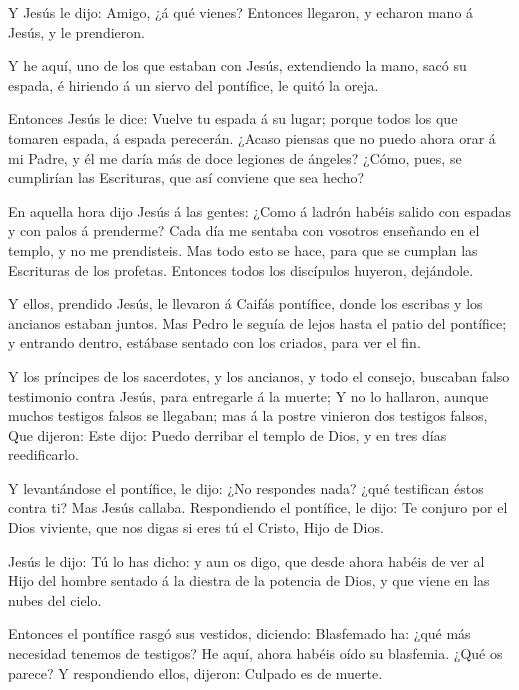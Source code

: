  Y Jesús le dijo: Amigo, ¿á qué vienes? Entonces llegaron,
y echaron mano á Jesús, y le prendieron.

 Y he aquí, uno de los que estaban con Jesús, extendiendo
la mano, sacó su espada, é hiriendo á un siervo del pontífice, le quitó
la oreja.

 Entonces Jesús le dice: Vuelve tu espada á su lugar;
porque todos los que tomaren espada, á espada perecerán. 
¿Acaso piensas que no puedo ahora orar á mi Padre, y él me daría más de
doce legiones de ángeles?  ¿Cómo, pues, se cumplirían las
Escrituras, que así conviene que sea hecho?

 En aquella hora dijo Jesús á las gentes: ¿Como á ladrón
habéis salido con espadas y con palos á prenderme? Cada día me sentaba
con vosotros enseñando en el templo, y no me prendisteis. 
Mas todo esto se hace, para que se cumplan las Escrituras de los
profetas. Entonces todos los discípulos huyeron, dejándole.

 Y ellos, prendido Jesús, le llevaron á Caifás pontífice,
donde los escribas y los ancianos estaban juntos.  Mas
Pedro le seguía de lejos hasta el patio del pontífice; y entrando
dentro, estábase sentado con los criados, para ver el fin.

 Y los príncipes de los sacerdotes, y los ancianos, y todo
el consejo, buscaban falso testimonio contra Jesús, para entregarle á la
muerte;  Y no lo hallaron, aunque muchos testigos falsos se
llegaban; mas á la postre vinieron dos testigos falsos, 
Que dijeron: Este dijo: Puedo derribar el templo de Dios, y en tres días
reedificarlo.

 Y levantándose el pontífice, le dijo: ¿No respondes nada?
¿qué testifican éstos contra ti?  Mas Jesús callaba.
Respondiendo el pontífice, le dijo: Te conjuro por el Dios viviente, que
nos digas si eres tú el Cristo, Hijo de Dios.

 Jesús le dijo: Tú lo has dicho: y aun os digo, que desde
ahora habéis de ver al Hijo del hombre sentado á la diestra de la
potencia de Dios, y que viene en las nubes del cielo.

 Entonces el pontífice rasgó sus vestidos, diciendo:
Blasfemado ha: ¿qué más necesidad tenemos de testigos? He aquí, ahora
habéis oído su blasfemia.  ¿Qué os parece? Y respondiendo
ellos, dijeron: Culpado es de muerte.

